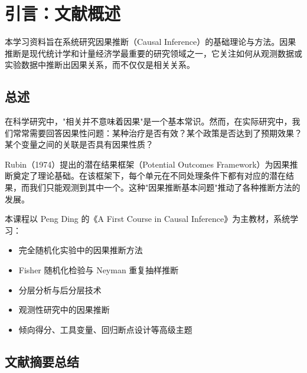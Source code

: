 \chapter*{引言：文献概述}\label{chap:introduction}

本学习资料旨在系统研究因果推断（Causal Inference）的基础理论与方法。因果推断是现代统计学和计量经济学最重要的研究领域之一，它关注如何从观测数据或实验数据中推断出因果关系，而不仅仅是相关关系。

\section{总述}

在科学研究中，"相关并不意味着因果"是一个基本常识。然而，在实际研究中，我们常常需要回答因果性问题：某种治疗是否有效？某个政策是否达到了预期效果？某个变量之间的关联是否具有因果性质？

Rubin（1974）提出的潜在结果框架（Potential Outcomes Framework）为因果推断奠定了理论基础。在该框架下，每个单元在不同处理条件下都有对应的潜在结果，而我们只能观测到其中一个。这种"因果推断基本问题"推动了各种推断方法的发展。

本课程以 Peng Ding 的《A First Course in Causal Inference》为主教材，系统学习：
\begin{itemize}
    \item 完全随机化实验中的因果推断方法
    \item Fisher 随机化检验与 Neyman 重复抽样推断
    \item 分层分析与后分层技术
    \item 观测性研究中的因果推断
    \item 倾向得分、工具变量、回归断点设计等高级主题
\end{itemize}

\section{文献摘要总结}\label{sec:literature-summary}

